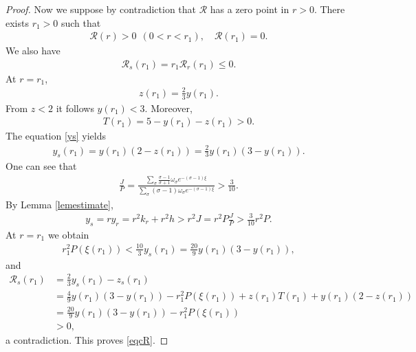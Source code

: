 \documentclass{article}
\theoremstyle{definition} \theoremstyle{remark}
\numberwithin{equation}{section}
\newcommand{\cR}{\mathcal{R}}
\begin{document}
\begin{proof}
		Now we suppose by contradiction that $\cR$ has a zero point in $r > 0$. There exists $r_1 > 0$ such that
		\begin{align*}
			\cR(r) > 0 ~~ (0 < r < r_1), \quad \cR(r_1) = 0.
		\end{align*}
		We also have
		\begin{align*}
			\cR_s(r_1) = r_1\cR_r(r_1) \le 0.
		\end{align*}
		At $r = r_1$,
		\begin{align*}
			z(r_1) = \frac{2}{3}y(r_1).
		\end{align*}
		From $z < 2$ it follows $y(r_1) < 3$. Moreover,
		\begin{align*}
			T(r_1) = 5 - y(r_1)- z(r_1) > 0.
		\end{align*}
		The equation \eqref{ys} yields
		\begin{align*}
			y_s(r_1) = y(r_1)(2-z(r_1)) = \frac{2}{3}y(r_1)(3-y(r_1)).
		\end{align*}
		One can see that
		\begin{align*}
			\frac{J}{P} = \frac{\sum_\sigma \frac{\sigma-1}{\sigma +1}\omega_\sigma e^{-(\sigma - 1)\xi}}{\sum_\sigma (\sigma - 1)\omega_\sigma e^{-(\sigma - 1)\xi}} > \frac{3}{10}.
		\end{align*}
		By Lemma \ref{lemestimate},
		\begin{align*}
			y_s = ry_r = r^2k_r + r^2h > r^2J = r^2P \frac{J}{P} > \frac{3}{10}r^2P.
		\end{align*}
		At $r = r_1$ we obtain
		\begin{align*}
			r_1^2P(\xi(r_1)) < \frac{10}{3}y_s(r_1) = \frac{20}{9}y(r_1)(3-y(r_1)),
		\end{align*}
		and
		\begin{align*}
			\cR_s(r_1) & = \frac23 y_s(r_1) - z_s(r_1) \\
			& = \frac{4}{9}y(r_1)(3-y(r_1)) - r_1^2P(\xi(r_1)) + z(r_1)T(r_1) + y(r_1)(2-z(r_1)) \\
			& = \frac{20}{9}y(r_1)(3-y(r_1)) - r_1^2P(\xi(r_1)) \\
			& > 0,
		\end{align*}
		a contradiction. This proves \eqref{eqcR}.


\end{proof}
\end{document}
